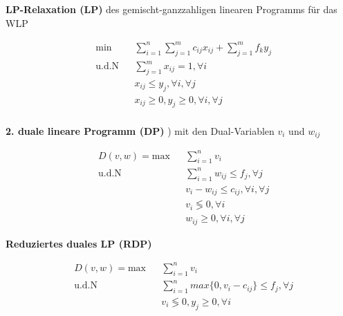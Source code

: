      \par \textbf{LP-Relaxation (LP)} des gemischt-ganzzahligen linearen Programms für das WLP

      \begin{equation}
        \begin{aligned}
          & \underset{}{\text{min}}
          && \sum_{i=1}^{n}\sum_{j=1}^{m}c_{ij}x_{ij} + \sum_{j=1}^{m}f_ky_{j}\\
          & \text{u.d.N}
          & & \sum_{j=1}^{m}x_{ij}=1, \forall i \\
          & & & x_{ij} \leq y_j, \forall i, \forall j \\ 
          & & & x_{ij} \geq 0, y_j \geq 0, \forall i, \forall j \\
        \end{aligned}
      \end{equation}

      \par \textbf{2. duale lineare Programm (DP)} ) mit den Dual-Variablen $v_i$ und $w_{ij}$ 

      \begin{equation}
        \begin{aligned}
          & D(v, w) = \text{max}
          && \sum_{i=1}^{n}v_i\\
          & \text{u.d.N}
          & & \sum_{i=1}^{n}w_{ij} \leq f_j, \forall j \\
          & & & v_i - w_{ij} \leq c_{ij}, \forall i, \forall j \\
          & & & v_i \lessgtr 0, \forall i\\
          & & & w_{ij} \geq 0, \forall i, \forall j
        \end{aligned}
      \end{equation}

      \par \textbf{Reduziertes duales LP (RDP)}

      \begin{equation}
        \begin{aligned}
          & D(v, w) = \text{max}
          && \sum_{i=1}^{n}v_i\\
          & \text{u.d.N}
          & & \sum_{i=1}^{n}max\{0, v_i- c_{ij}\} \leq f_j, \forall j \\
          & & & v_i \lessgtr 0, y_j \geq 0, \forall i
        \end{aligned}
      \end{equation}

